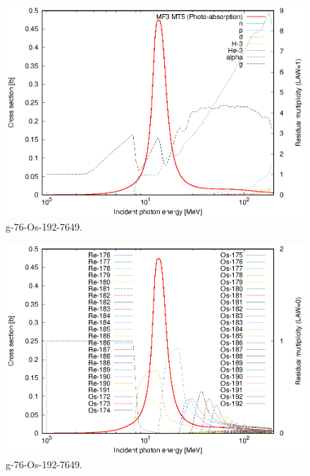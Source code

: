 \begin{figure}
 \includegraphics[width=\linewidth]{eps/g_76-Os-192_7649.eps}
  \caption{g-76-Os-192-7649.}
\end{figure}
\begin{figure}
 \includegraphics[width=\linewidth]{eps-law0/g_76-Os-192_7649.eps}
 \caption{g-76-Os-192-7649.}
\end{figure}
\newpage \clearpage


